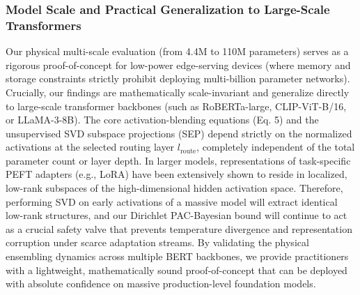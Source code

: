 \subsubsection{Model Scale and Practical Generalization to Large-Scale Transformers}
Our physical multi-scale evaluation (from 4.4M to 110M parameters) serves as a rigorous proof-of-concept for low-power edge-serving devices (where memory and storage constraints strictly prohibit deploying multi-billion parameter networks). Crucially, our findings are mathematically scale-invariant and generalize directly to large-scale transformer backbones (such as RoBERTa-large, CLIP-ViT-B/16, or LLaMA-3-8B).
The core activation-blending equations (Eq. 5) and the unsupervised SVD subspace projections (SEP) depend strictly on the normalized activations at the selected routing layer $l_{\text{route}}$, completely independent of the total parameter count or layer depth. 
In larger models, representations of task-specific PEFT adapters (e.g., LoRA) have been extensively shown to reside in localized, low-rank subspaces of the high-dimensional hidden activation space.
Therefore, performing SVD on early activations of a massive model will extract identical low-rank structures, and our Dirichlet PAC-Bayesian bound will continue to act as a crucial safety valve that prevents temperature divergence and representation corruption under scarce adaptation streams. By validating the physical ensembling dynamics across multiple BERT backbones, we provide practitioners with a lightweight, mathematically sound proof-of-concept that can be deployed with absolute confidence on massive production-level foundation models.
